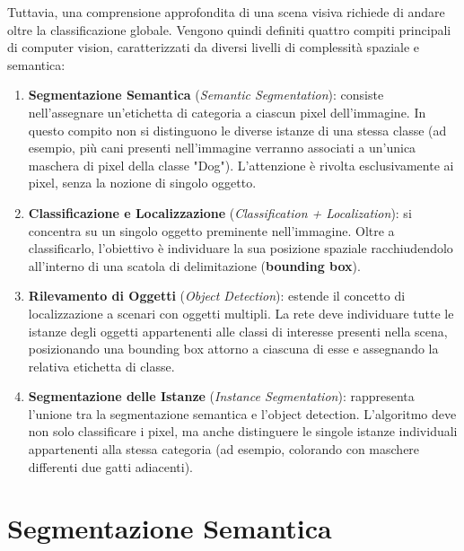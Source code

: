 ﻿\documentclass[11pt, a4paper]{article}
\begin{document}
Tuttavia, una comprensione approfondita di una scena visiva richiede di andare oltre la classificazione globale. Vengono quindi definiti quattro compiti principali di computer vision, caratterizzati da diversi livelli di complessità spaziale e semantica:


\begin{enumerate}
    \item \textbf{Segmentazione Semantica} (\emph{Semantic Segmentation}): consiste nell'assegnare un'etichetta di categoria a ciascun pixel dell'immagine. In questo compito non si distinguono le diverse istanze di una stessa classe (ad esempio, più cani presenti nell'immagine verranno associati a un'unica maschera di pixel della classe "Dog"). L'attenzione è rivolta esclusivamente ai pixel, senza la nozione di singolo oggetto.
    \item \textbf{Classificazione e Localizzazione} (\emph{Classification + Localization}): si concentra su un singolo oggetto preminente nell'immagine. Oltre a classificarlo, l'obiettivo è individuare la sua posizione spaziale racchiudendolo all'interno di una scatola di delimitazione (\textbf{bounding box}).
    \item \textbf{Rilevamento di Oggetti} (\emph{Object Detection}): estende il concetto di localizzazione a scenari con oggetti multipli. La rete deve individuare tutte le istanze degli oggetti appartenenti alle classi di interesse presenti nella scena, posizionando una bounding box attorno a ciascuna di esse e assegnando la relativa etichetta di classe.
    \item \textbf{Segmentazione delle Istanze} (\emph{Instance Segmentation}): rappresenta l'unione tra la segmentazione semantica e l'object detection. L'algoritmo deve non solo classificare i pixel, ma anche distinguere le singole istanze individuali appartenenti alla stessa categoria (ad esempio, colorando con maschere differenti due gatti adiacenti).
\end{enumerate}

\newpage

\section{Segmentazione Semantica}
\end{document}
